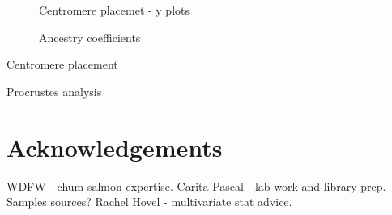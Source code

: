 \documentclass[12pt, one column]{article}
\begin{document}
\begin{figure}[H]
\caption[SUPPLEMENTAL - Genome scan - Bayescan Fst]{ Centromere placemet - y plots}
\end{figure}

\begin{figure}[H]
\caption[SUPPLEMENTAL - Q plot - ancestry coefficients]{Ancestry coefficients}
\end{figure}


\begin{table}[H]
\caption[SUPPLEMENTAL - centromere placement]{Centromere placement}
\end {table}

\begin{table}[H]
\caption[SUPPLEMENTAL - Procrustes analysis]{Procrustes analysis}
\end {table}





\section*{Acknowledgements}
WDFW - chum salmon expertise.
Carita Pascal - lab work and library prep.
Samples sources?
Rachel Hovel - multivariate stat advice.
\end{document}

